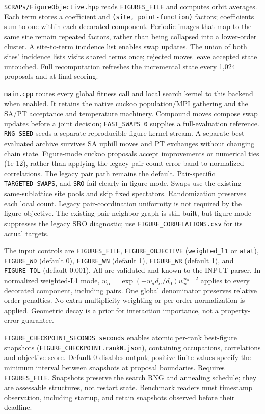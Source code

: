\documentclass[
  11pt,
]{article}
\begin{document}
\texttt{SCRAPs/FigureObjective.hpp} reads \texttt{FIGURES\_FILE} and
computes orbit averages. Each term stores a coefficient and
\texttt{(site,\ point-function)} factors; coefficients sum to one within
each decorated component. Periodic images that map to the same site
remain repeated factors, rather than being collapsed into a lower-order
cluster. A site-to-term incidence list enables swap updates. The union
of both sites' incidence lists visits shared terms once; rejected moves
leave accepted state untouched. Full recomputation refreshes the
incremental state every 1,024 proposals and at final scoring.

\texttt{main.cpp} routes every global fitness call and local search
kernel to this backend when enabled. It retains the native cuckoo
population/MPI gathering and the SA/PT acceptance and temperature
machinery. Compound moves compose swap updates before a joint decision;
\texttt{FAST\_SWAPS\ 0} supplies a full-evaluation reference.
\texttt{RNG\_SEED} seeds a separate reproducible figure-kernel stream. A
separate best-evaluated archive survives SA uphill moves and PT
exchanges without changing chain state. Figure-mode cuckoo proposals
accept improvements or numerical ties (1e-12), rather than applying the
legacy pair-count error band to normalized correlations. The legacy pair
path remains the default. Pair-specific \texttt{TARGETED\_SWAPS}, and
\texttt{SRO} fail clearly in figure mode. Swaps use the existing
same-sublattice site pools and skip fixed spectators. Randomization
preserves each local count. Legacy pair-coordination uniformity is not
required by the figure objective. The existing pair neighbor graph is
still built, but figure mode suppresses the legacy SRO diagnostic; use
\texttt{FIGURE\_CORRELATIONS.csv} for its actual targets.

The input controls are \texttt{FIGURES\_FILE},
\texttt{FIGURE\_OBJECTIVE} (\texttt{weighted\_l1} or \texttt{atat}),
\texttt{FIGURE\_WD} (default 0), \texttt{FIGURE\_WN} (default 1),
\texttt{FIGURE\_WR} (default 1), and \texttt{FIGURE\_TOL} (default
0.001). All are validated and known to the INPUT parser. In normalized
weighted-L1 mode, \(w_\alpha=\exp(-w_d d_\alpha/d_0)w_n^{n_\alpha-2}\)
applies to every decorated component, including pairs. One global
denominator preserves relative order penalties. No extra multiplicity
weighting or per-order normalization is applied. Geometric decay is a
prior for interaction importance, not a property-error guarantee.

\texttt{FIGURE\_CHECKPOINT\_SECONDS\ seconds} enables atomic per-rank
best-figure snapshots (\texttt{FIGURE\_CHECKPOINT.rankN.json}),
containing occupations, correlations and objective score. Default 0
disables output; positive finite values specify the minimum interval
between snapshots at proposal boundaries. Requires
\texttt{FIGURES\_FILE}. Snapshots preserve the search RNG and annealing
schedule; they are assessable structures, not restart state. Benchmark
readers must timestamp observation, including startup, and retain
snapshots observed before their deadline.
\end{document}
